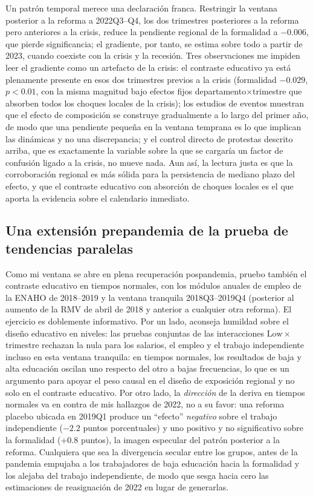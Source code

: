 Un patrón temporal merece una declaración franca. Restringir la ventana posterior a la reforma a 2022Q3--Q4, los dos trimestres posteriores a la reforma pero anteriores a la crisis, reduce la pendiente regional de la formalidad a $-0.006$, que pierde significancia; el gradiente, por tanto, se estima sobre todo a partir de 2023, cuando coexiste con la crisis y la recesión. Tres observaciones me impiden leer el gradiente como un artefacto de la crisis: el contraste educativo ya está plenamente presente en esos dos trimestres previos a la crisis (formalidad $-0.029$, $p<0.01$, con la misma magnitud bajo efectos fijos departamento$\times$trimestre que absorben todos los choques locales de la crisis); los estudios de eventos muestran que el efecto de composición se construye gradualmente a lo largo del primer año, de modo que una pendiente pequeña en la ventana temprana es lo que implican las dinámicas y no una discrepancia; y el control directo de protestas descrito arriba, que es exactamente la variable sobre la que se cargaría un factor de confusión ligado a la crisis, no mueve nada. Aun así, la lectura justa es que la corroboración regional es más sólida para la persistencia de mediano plazo del efecto, y que el contraste educativo con absorción de choques locales es el que aporta la evidencia sobre el calendario inmediato.

\subsection{Una extensión prepandemia de la prueba de tendencias paralelas}

Como mi ventana se abre en plena recuperación pospandemia, pruebo también el contraste educativo en tiempos normales, con los módulos anuales de empleo de la ENAHO de 2018--2019 y la ventana tranquila 2018Q3--2019Q4 (posterior al aumento de la RMV de abril de 2018 y anterior a cualquier otra reforma). El ejercicio es doblemente informativo. Por un lado, aconseja humildad sobre el diseño educativo en niveles: las pruebas conjuntas de las interacciones $\mathrm{Low}\times$trimestre rechazan la nula para los salarios, el empleo y el trabajo independiente incluso en esta ventana tranquila: en tiempos normales, los resultados de baja y alta educación oscilan uno respecto del otro a bajas frecuencias, lo que es un argumento para apoyar el peso causal en el diseño de exposición regional y no solo en el contraste educativo. Por otro lado, la \emph{dirección} de la deriva en tiempos normales va en contra de mis hallazgos de 2022, no a su favor: una reforma placebo ubicada en 2019Q1 produce un ``efecto'' \emph{negativo} sobre el trabajo independiente ($-2.2$ puntos porcentuales) y uno positivo y no significativo sobre la formalidad ($+0.8$ puntos), la imagen especular del patrón posterior a la reforma. Cualquiera que sea la divergencia secular entre los grupos, antes de la pandemia empujaba a los trabajadores de baja educación hacia la formalidad y los alejaba del trabajo independiente, de modo que sesga hacia cero las estimaciones de reasignación de 2022 en lugar de generarlas.


